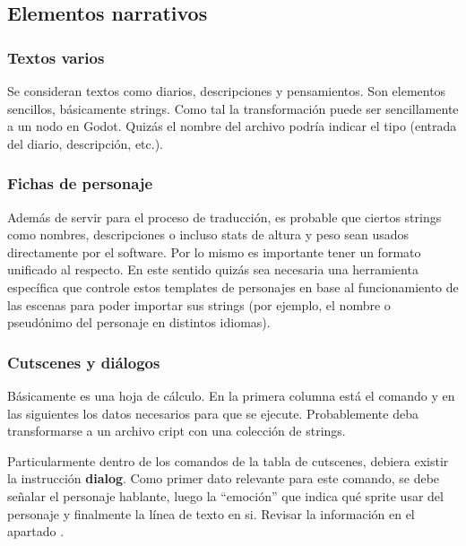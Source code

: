 
\subsection{Elementos narrativos}\label{kit:elementos-narrativos}

\subsubsection{Textos varios}\label{kit:textos-varios}
Se consideran textos como diarios, descripciones y pensamientos. Son elementos sencillos, básicamente strings. Como tal la transformación puede ser sencillamente a un nodo en Godot. Quizás el nombre del archivo podría indicar el tipo (entrada del diario, descripción, etc.). 

\subsubsection{Fichas de personaje}\label{kit:fichas-de-personaje}
Además de servir para el proceso de traducción, es probable que ciertos strings como nombres, descripciones o incluso stats de altura y peso sean usados directamente por el software. Por lo mismo es importante tener un formato unificado al respecto. En este sentido quizás sea necesaria una herramienta específica que controle estos templates de personajes en base al funcionamiento de las escenas para poder importar sus strings (por ejemplo, el nombre o pseudónimo del personaje en distintos idiomas).

\subsubsection{Cutscenes y diálogos}\label{kit:cutscenes-y-dialogos}
Básicamente es una hoja de cálculo. En la primera columna está el comando y en las siguientes los datos necesarios para que se ejecute. Probablemente deba transformarse a un archivo cript con una colección de strings.

Particularmente dentro de los comandos de la tabla de cutscenes, debiera existir la instrucción \textbf{dialog}. Como primer dato relevante para este comando, se debe señalar el personaje hablante, luego la “emoción” que indica qué sprite usar del personaje y finalmente la línea de texto en si. Revisar la información en el apartado .

